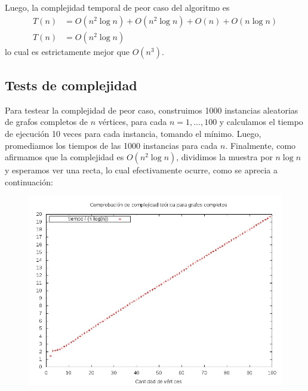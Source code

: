 Luego, la complejidad temporal de peor caso del algoritmo es 
\begin{align*}
T(n) &= O(n^2 \log n) + O(n^2 \log n) + O(n) + O(n \log n) \\
T(n) &= O(n^2 \log n)
\end{align*}
lo cual es estrictamente mejor que $O(n^3)$.

\subsection{Tests de complejidad}

Para testear la complejidad de peor caso, construimos 1000 instancias aleatorias de grafos completos de $n$ vértices, para cada $n = {1, ... , 100}$ y calculamos el tiempo de ejecución 10 veces para cada instancia, tomando el mínimo. Luego, promediamos los tiempos de las 1000 instancias para cada $n$. Finalmente, como afirmamos que la complejidad es $O(n^2 \log n)$, dividimos la muestra por $n \log n$ y esperamos ver una recta, lo cual efectivamente ocurre, como se aprecia a continuación:

\begin{figure}[H]
	\begin{minipage}[t]{\linewidth}
		\centering
		\includegraphics[width=\textwidth]{p3_complejidad_grafos_completos.jpg}
		\label{fig:p3_complejidad_grafos_completos}
	\end{minipage}
\end{figure}


